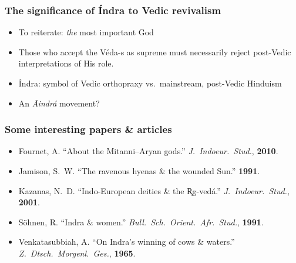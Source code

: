 \documentclass[pdf]{beamer}
\begin{document}
\begin{frame} \frametitle{The significance of Índra to Vedic revivalism}
\begin{itemize}
	\item To reiterate: \emph{the} most important God
	\item Those who accept the Véda-s as supreme must necessarily reject post-Vedic interpretations of His role.
	\item Índra: symbol of Vedic orthopraxy vs.~mainstream, post-Vedic Hinduism
	\item An \textit{Āindrá} movement?
\end{itemize}
\end{frame}


\begin{frame} \frametitle{Some interesting papers \& articles}
\begin{itemize}
	\item Fournet, A. ``About the Mitanni--Aryan gods.'' \textit{J.~Indoeur.~Stud.}, \textbf{2010}.
	\item Jamison, S.~W. ``The ravenous hyenas \& the wounded Sun.'' \textbf{1991}.
	\item Kazanas, N.~D. ``Indo-European deities \& the R̥g-vedá.'' \textit{J.~Indoeur.~Stud.}, \textbf{2001}.
	\item Söhnen, R. ``Indra \& women.'' \textit{Bull.~Sch.~Orient.~Afr.~Stud.}, \textbf{1991}.
	\item Venkatasubbiah, A. ``On Indra's winning of cows \& waters.'' \textit{Z.~Dtsch.~Morgenl.~Ges.}, \textbf{1965}.
\end{itemize}
\end{frame}
\end{document}
